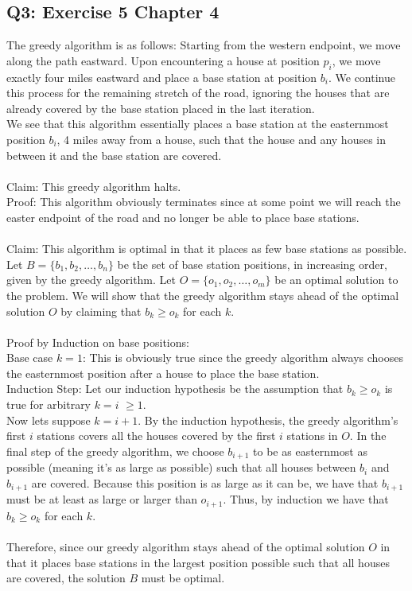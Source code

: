 \documentclass[12pt, oneside]{article}
\begin{document}
\subsection*{Q3: Exercise 5 Chapter 4}
The greedy algorithm is as follows: Starting from the western endpoint, we move along the path eastward. Upon encountering a house at position $p_i$, we move exactly four miles eastward and place a base station at position $b_i$. We continue this process for the remaining stretch of the road, ignoring the houses that are already covered by the base station placed in the last iteration.\\
We see that this algorithm essentially places a base station at the easternmost position $b_i$, 4 miles away from a house, such that the house and any houses in between it and the base station are covered.\\\\
Claim: This greedy algorithm halts.\\
Proof: This algorithm obviously terminates since at some point we will reach the easter endpoint of the road and no longer be able to place base stations.\\\\
Claim: This algorithm is optimal in that it places as few base stations as possible.\\
Let $B = \{b_1,b_2,\dots,b_n\}$ be the set of base station positions, in increasing order, given by the greedy algorithm. Let $O = \{o_1,o_2,\dots,o_m\}$ be an optimal solution to the problem. We will show that the greedy algorithm stays ahead of the optimal solution $O$ by claiming that $b_k \geq o_k$ for each $k$.\\\\
Proof by Induction on base positions:\\
Base case $k=1$: This is obviously true since the greedy algorithm always chooses the easternmost position after a house to place the base station.\\
Induction Step: Let our induction hypothesis be the assumption that $b_k \geq o_k$ is true for arbitrary $k = i$  $\geq 1$.\\ Now lets suppose $k = i+1$. By the induction hypothesis, the greedy algorithm's first $i$ stations covers all the houses covered by the first $i$ stations in $O$. In the final step of the greedy algorithm, we choose $b_{i+1}$ to be as easternmost as possible (meaning it's as large as possible) such that all houses between $b_i$ and $b_{i+1}$ are covered. Because this position is as large as it can be, we have that $b_{i+1}$ must be at least as large or larger than $o_{i+1}$. Thus, by induction we have that $b_k \geq o_k$ for each $k$.\\\\
Therefore, since our greedy algorithm stays ahead of the optimal solution $O$ in that it places base stations in the largest position possible such that all houses are covered, the solution $B$ must be optimal.\\
\end{document}
